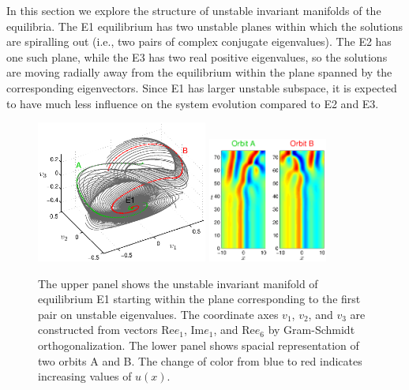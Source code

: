 In this section we explore the structure of unstable invariant
manifolds of the equilibria.  The E1 equilibrium has two unstable
planes within which the solutions are spiralling out (i.e., two
pairs of complex conjugate eigenvalues).  The E2 has one such plane,
while the E3 has two real positive eigenvalues, so the solutions are
moving radially away from the equilibrium within the plane spanned
by the corresponding eigenvectors.  Since E1 has larger unstable
subspace, it is expected to have much less influence on the system
evolution compared to E2 and E3.

\begin{figure}[h]\vspace*{-5pt} \centering
\includegraphics[width=0.5\textwidth]{figs/ks22_E1_plane1_manifold.eps}
\includegraphics[width=0.35\textwidth]{figs/ks22_E1_plane1_orbits.eps}
\vspace*{-5pt}\caption{ {\small The upper panel shows the unstable
invariant manifold of equilibrium E1 starting within the plane
corresponding to the first pair on unstable eigenvalues. The
coordinate axes $v_1$, $v_2$, and $v_3$ are constructed from vectors
$\mathrm{Re} e_1$, $\mathrm{Im} e_1$, and $\mathrm{Re} e_6$
by Gram-Schmidt orthogonalization.
The lower panel shows spacial representation of two orbits A and B.
The change of color from blue to red indicates increasing values of
$u(x)$.}} \label{f:KS22E1man1}\vspace*{-5pt}
\end{figure}

